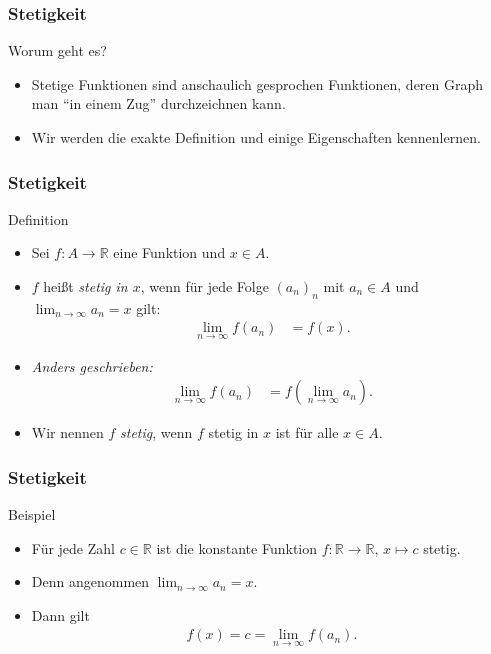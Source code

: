 \documentclass{beamer}
\title[Annuma]{\mytitle}
\author[Amin Coja-Oghlan]{Amin Coja-Oghlan}
\institute[Frankfurt]{JWGUFFM}
\date{}
\renewcommand{\emph}[1]{{\textcolor{solarizedRed}{\itshape #1}}}
\newcommand\RR{\mathbb R}
\newcommand{\ue}{\"u}
\newcommand{\mytitle}{Stetigkeit}
\begin{document}
\frame[plain]{\titlepage}

\begin{frame}\frametitle{\mytitle}
	\begin{block}{Worum geht es?}
		\begin{itemize}
			\item Stetige Funktionen sind anschaulich gesprochen Funktionen, deren Graph man ``in einem Zug'' durchzeichnen kann.
			\item Wir werden die exakte Definition und einige Eigenschaften kennenlernen.
		\end{itemize}
	\end{block}
\end{frame}

\begin{frame}\frametitle{\mytitle}
	\begin{block}{Definition}
		\begin{itemize}
			\item Sei $f:A\to\RR$ eine Funktion und $x\in A$.
			\item $f$ hei\ss t \emph{stetig in $x$}, wenn f\ue r jede Folge $(a_n)_n$ mit $a_n\in A$ und $\lim_{n\to\infty}a_n=x$ gilt:
				\begin{align*}
					\lim_{n\to\infty}f(a_n)&=f(x).
				\end{align*}
			\item {\itshape Anders geschrieben:}
				\begin{align*}
					\lim_{n\to\infty}f(a_n)&=f(\lim_{n\to\infty}a_n).
				\end{align*}
			\item Wir nennen $f$ \emph{stetig}, wenn $f$ stetig in $x$ ist f\ue r alle $x\in A$.
		\end{itemize}
	\end{block}
\end{frame}

\begin{frame}\frametitle{\mytitle}
	\begin{block}{Beispiel}
		\begin{itemize}
			\item F\ue r jede Zahl $c\in\RR$ ist die konstante Funktion $f:\RR\to\RR$, $x\mapsto c$ stetig.
			\item Denn angenommen $\lim_{n\to\infty}a_n=x$.
			\item Dann gilt
				\begin{align*}
					f(x)=c=\lim_{n\to\infty}f(a_n).
				\end{align*}
		\end{itemize}
	\end{block}
\end{frame}
\end{document}
